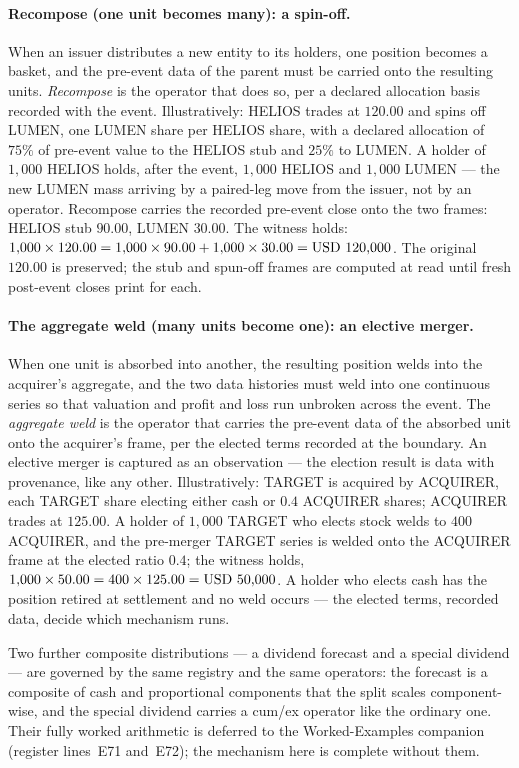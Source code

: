 \paragraph{Recompose (one unit becomes many): a spin-off.}
When an issuer distributes a new entity to its holders, one position becomes a basket, and
the pre-event data of the parent must be carried onto the resulting units. \emph{Recompose}
is the operator that does so, per a declared allocation basis recorded with the event.
Illustratively: HELIOS trades at $120.00$ and spins off LUMEN, one LUMEN share per HELIOS
share, with a declared allocation of $75\%$ of pre-event value to the HELIOS stub and
$25\%$ to LUMEN. A holder of $1{,}000$ HELIOS holds, after the event, $1{,}000$ HELIOS and
$1{,}000$ LUMEN --- the new LUMEN mass arriving by a paired-leg move from the issuer, not by
an operator. Recompose carries the recorded pre-event close onto the two frames: HELIOS stub
$90.00$, LUMEN $30.00$. The witness holds: $1{,}000 \times 120.00 = 1{,}000 \times 90.00 +
1{,}000 \times 30.00 = \mbox{USD~120{,}000}$. The original $120.00$ is preserved; the stub and
spun-off frames are computed at read until fresh post-event closes print for each.

\paragraph{The aggregate weld (many units become one): an elective merger.}
When one unit is absorbed into another, the resulting position welds into the acquirer's
aggregate, and the two data histories must weld into one continuous series so that valuation
and profit and loss run unbroken across the event. The \emph{aggregate weld} is the operator
that carries the pre-event data of the absorbed unit onto the acquirer's frame, per the
elected terms recorded at the boundary. An elective merger is captured as an observation ---
the election result is data with provenance, like any other. Illustratively: TARGET is
acquired by ACQUIRER, each TARGET share electing either  cash or $0.4$ ACQUIRER
shares; ACQUIRER trades at $125.00$. A holder of $1{,}000$ TARGET who elects stock welds to
$400$ ACQUIRER, and the pre-merger TARGET series is welded onto the ACQUIRER frame at the
elected ratio $0.4$; the witness holds, $1{,}000 \times 50.00 = 400 \times 125.00 =
\mbox{USD~50{,}000}$. A holder who elects cash has the position retired at settlement and no weld
occurs --- the elected terms, recorded data, decide which mechanism runs.

Two further composite distributions --- a dividend forecast and a special dividend --- are
governed by the same registry and the same operators: the forecast is a composite of cash
and proportional components that the split scales component-wise, and the special dividend
carries a cum/ex operator like the ordinary one. Their fully worked arithmetic is deferred
to the Worked-Examples companion (register lines~E71 and~E72); the mechanism here is
complete without them.

